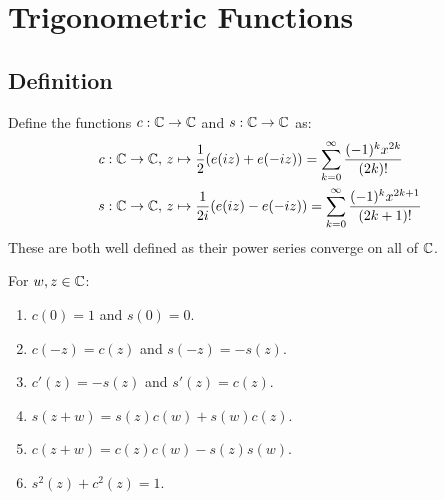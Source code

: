 \documentclass[../main.tex]{subfiles}
\begin{document}
\section{Trigonometric Functions}
\subsection{Definition}
\begin{definition}
  Define the functions $c:\mathbb{C} \to \mathbb{C}$ and $s: \mathbb{C} \to \mathbb{C}$ as:
  \begin{align*}
    c: \mathbb{C} \to \mathbb{C},&\ z \mapsto \frac{1}{2}(e(iz) + e(-iz)) = \sum_{k = 0}^{\infty} \frac{(-1)^{k}x^{2k}}{(2k)!} \\
    s: \mathbb{C} \to \mathbb{C},&\ z \mapsto \frac{1}{2i}(e(iz) - e(-iz)) = \sum_{k = 0}^{\infty} \frac{(-1)^{k}x^{2k + 1}}{(2k + 1)!}
  \end{align*}
  These are both well defined as their power series converge on all of $\mathbb{C}$.
\end{definition}
\begin{lemma}
  For $w, z \in \mathbb{C}$: \label{trigIdentities}
  \begin{enumerate}
    \item $c(0) = 1$ and $s(0) = 0$.
    \item $c(-z) = c(z)$ and $s(-z) = -s(z)$.
    \item $c'(z) = -s(z)$ and $s'(z) = c(z)$.
    \item $s(z + w) = s(z)c(w) + s(w)c(z)$.
    \item $c(z + w) = c(z)c(w) - s(z)s(w)$.
    \item $s^2(z) + c^2(z) = 1$.
  \end{enumerate}
\end{lemma}
\end{document}
